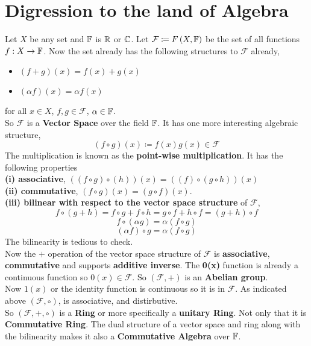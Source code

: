 \documentclass{scrartcl} %
\newcommand{\sF}{\mathcal{F}}
\begin{document}
\section{Digression to the land of Algebra}
Let $X$ be any set and $\mathbb F$ is $\mathbb R$ or $\mathbb C$. 
Let $\sF \coloneq F\left(X,\FF\right)$ be the set of
all functions $f : X \rightarrow \mathbb F$. Now the
 set already has the following structures to $\sF$
already,
\begin{itemize}
	\item $\left(f + g\right)(x) = f(x) + g(x)$
	\item $\left(\alpha f\right)(x) = \alpha f(x)$
\end{itemize}
for all $x \in X$, $f, g \in \sF$, $\alpha \in \mathbb F$.\\
So $\sF$ is a \textbf{Vector Space} over the field
$\mathbb F$.
It has one more interesting algebraic structure,
\[
\left(f\circ g \right)(x) \coloneq f(x)g(x) \in \sF 
\]
The multiplication is known as the \textbf{point-wise
multiplication}. It has the following
properties \\
\textbf{(i) associative},
$\left(\left(f\circ g \right)\circ \left(h\right)\right) (x) = \left(\left(f\right)\circ\left(g\circ h
	\right)\right)(x)$\\
\textbf{(ii) commutative},
$\left(f\circ g\right)(x) = \left(g\circ f \right)(x)$.
\\
\textbf{(iii) bilinear with respect to the
vector space structure} of $\sF$,
\[
f\circ \left(g + h\right) = f\circ g + f\circ h = g\circ f + 
h\circ f =
\left(g + h\right)\circ f
\]
\[
	f\circ\left(\alpha g\right)  = 
	\alpha \left(f\circ g\right) 
\]
\[
\left(\alpha f\right)\circ g = \alpha \left( f\circ g\right) 
\]
The bilinearity is tedious to check.\\
Now the $+$ operation of the vector space structure of 
$\sF$ is \textbf{associative}, \textbf{commutative} and
supports \textbf{additive inverse}.
The \textbf{0(x)} function is already a continuous 
function so $0(x) \in \sF$.
So $\left(\sF, +\right)$ is an \textbf{Abelian group}.\\
Now $1(x)$ or the identity function is continuous
so it is in $\sF$. As indicated above
$\left(\sF, \circ \right)$, is associative, and
distirbutive.\\
So $\left(\sF, +, \circ \right)$ is a \textbf{Ring}
or more specifically a \textbf{unitary Ring}. Not only
that it is \textbf{Commutative Ring}. The dual structure
 of a vector space and ring along with the bilinearity 
 makes it also a 
\textbf{Commutative Algebra} over $\mathbb F$.\\
\end{document}
